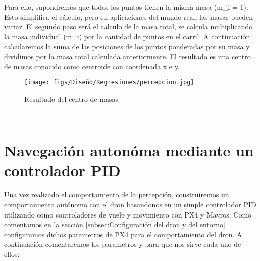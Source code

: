   Para ello, 
  supondremos que todos los puntos tienen la misma masa (m\_i = 1). Esto simplifica el cálculo, pero en aplicaciones del mundo real, las masas pueden variar.
  El segundo paso será el calculo de la masa total, se calcula multiplicando la masa individual (m\_i) por la cantidad de puntos en el carril. A continuación calcularemos
  la suma de las posiciones de los puntos ponderadas por su masa y dividimos por la masa total calculada anteriormente. El resultado es una centro de masas conocido como centroide
  con coordenada x e y. 

  \begin{figure} [H]
    \begin{center}
      \texttt{[image: figs/Diseño/Regresiones/percepcion.jpg]}
    \end{center}
    \caption{Resultado del centro de masas}
    \label{fig:centro de masas}
  \end{figure}\

  \section{Navegación autonóma mediante un controlador PID}
  \label{sec:Control}

  Una vez realizado el comportamiento de la percepción, construiremos un comportamiento autónomo con el dron basandonos en un simple controlador PID utilizando como controladores de vuelo
  y movimiento con PX4 y Mavros. 
  Como comentamos en la sección \ref{subsec:Configuración del dron y del entorno} configuramos dichos parametros de PX4 para el comportamiento del dron. A continuación comentaremos los parametros
  y para que nos sirve cada uno de ellos:

